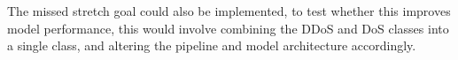 \documentclass[11pt,a4paper]{article}
\begin{document}
The missed stretch goal could also be implemented, to test whether this improves model performance, this would involve combining the DDoS and DoS classes into a single class, and altering the pipeline and model architecture accordingly.



\newpage
%
%


\end{document}
